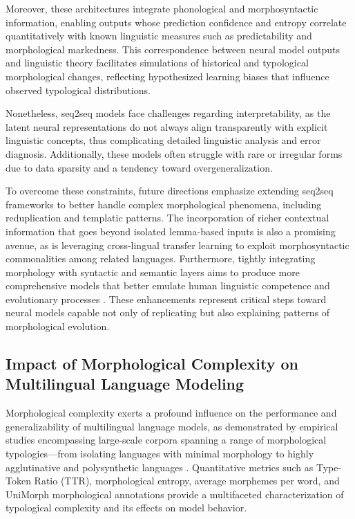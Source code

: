 Moreover, these architectures integrate phonological and morphosyntactic information, enabling outputs whose prediction confidence and entropy correlate quantitatively with known linguistic measures such as predictability and morphological markedness. This correspondence between neural model outputs and linguistic theory facilitates simulations of historical and typological morphological changes, reflecting hypothesized learning biases that influence observed typological distributions.

Nonetheless, seq2seq models face challenges regarding interpretability, as the latent neural representations do not always align transparently with explicit linguistic concepts, thus complicating detailed linguistic analysis and error diagnosis. Additionally, these models often struggle with rare or irregular forms due to data sparsity and a tendency toward overgeneralization. 

To overcome these constraints, future directions emphasize extending seq2seq frameworks to better handle complex morphological phenomena, including reduplication and templatic patterns. The incorporation of richer contextual information that goes beyond isolated lemma-based inputs is also a promising avenue, as is leveraging cross-lingual transfer learning to exploit morphosyntactic commonalities among related languages. Furthermore, tightly integrating morphology with syntactic and semantic layers aims to produce more comprehensive models that better emulate human linguistic competence and evolutionary processes \cite{ref42}. These enhancements represent critical steps toward neural models capable not only of replicating but also explaining patterns of morphological evolution.

\subsection{Impact of Morphological Complexity on Multilingual Language Modeling}

Morphological complexity exerts a profound influence on the performance and generalizability of multilingual language models, as demonstrated by empirical studies encompassing large-scale corpora spanning a range of morphological typologies—from isolating languages with minimal morphology to highly agglutinative and polysynthetic languages \cite{ref34}. Quantitative metrics such as Type-Token Ratio (TTR), morphological entropy, average morphemes per word, and UniMorph morphological annotations provide a multifaceted characterization of typological complexity and its effects on model behavior.

